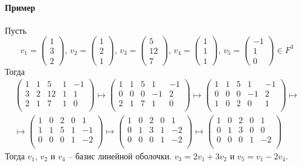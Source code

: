 \documentclass{article}
\begin{document}
\paragraph{Пример}
Пусть 
\[
v_1 =
\begin{pmatrix}
{1}\\{3}\\{2}
\end{pmatrix},\,
v_2 =
\begin{pmatrix}
{1}\\{2}\\{1}
\end{pmatrix},\,
v_3 =
\begin{pmatrix}
{5}\\{12}\\{7}
\end{pmatrix},\,
v_4 =
\begin{pmatrix}
{1}\\{1}\\{1}
\end{pmatrix},\,
v_5 =
\begin{pmatrix}
{-1}\\{1}\\{0}
\end{pmatrix}\in F^3
\]
Тогда
\begin{gather*}
\begin{pmatrix}
{1}&{1}&{5}&{1}&{-1}\\
{3}&{2}&{12}&{1}&{1}\\
{2}&{1}&{7}&{1}&{0}\\
\end{pmatrix}\mapsto
\begin{pmatrix}
{1}&{1}&{5}&{1}&{-1}\\
{0}&{0}&{0}&{-1}&{2}\\
{2}&{1}&{7}&{1}&{0}\\
\end{pmatrix}\mapsto
\begin{pmatrix}
{1}&{1}&{5}&{1}&{-1}\\
{0}&{0}&{0}&{-1}&{2}\\
{1}&{0}&{2}&{0}&{1}\\
\end{pmatrix}\mapsto\\\mapsto
\begin{pmatrix}
{1}&{0}&{2}&{0}&{1}\\
{1}&{1}&{5}&{1}&{-1}\\
{0}&{0}&{0}&{1}&{-2}\\
\end{pmatrix}\mapsto
\begin{pmatrix}
{1}&{0}&{2}&{0}&{1}\\
{0}&{1}&{3}&{1}&{-2}\\
{0}&{0}&{0}&{1}&{-2}\\
\end{pmatrix}\mapsto
\begin{pmatrix}
{1}&{0}&{2}&{0}&{1}\\
{0}&{1}&{3}&{0}&{0}\\
{0}&{0}&{0}&{1}&{-2}\\
\end{pmatrix}
\end{gather*}
Тогда $v_1$, $v_2$ и $v_4$ -- базис линейной оболочки. $v_3 = 2v_1 + 3 v_2$ и $v_5 = v_1 - 2 v_4$.
\end{document}
